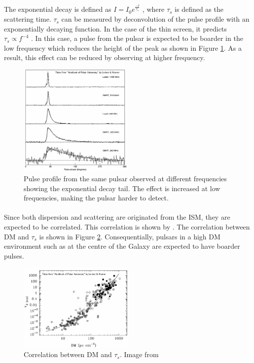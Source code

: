 \documentclass[thesis_msc.tex]{subfiles}
\begin{document}
The exponential decay is defined as $I=I_0 e^{\frac{-t}{\tau_s}}$ , where $\tau_s$ is defined as the scattering time. $\tau_s$ can be measured by deconvolution of the pulse profile with an exponentially decaying function. In the case of the thin screen, it predicts $\tau_s \propto f^{-4}$ \citep{xu2017scatter}. In this case, a pulse from the pulsar is expected to be boarder in the low frequency which reduces the height of the peak as shown in Figure \ref{pscatt}. As a result, this effect can be reduced by observing at higher frequency.

    \begin{figure}[h] \centering 
\includegraphics[width=0.5\textwidth]{figures/pulsescat.png}
\caption{Pulse profile from the same pulsar observed at different frequencies showing the exponential decay tail. The effect is increased at low frequencies, making the pulsar harder to detect. \citep{handbook}  }
\label{pscatt}
\end{figure}

\paragraph{} Since both dispersion and scattering are originated from the ISM, they are expected to be correlated. This correlation is shown by \cite{Bhat:2004xt}. The correlation between DM and $\tau_s$ is shown in Figure \ref{t_dm}. Consequentially, pulsars in a high DM environment such as at the centre of the Galaxy are expected to have boarder pulses.  

    \begin{figure}[h] \centering
\includegraphics[width=0.5\textwidth]{figures/t_dm.png}
\caption{Correlation between DM and $\tau_s$. Image from \citep{handbook}  }
\label{t_dm}
\end{figure}
\end{document}
